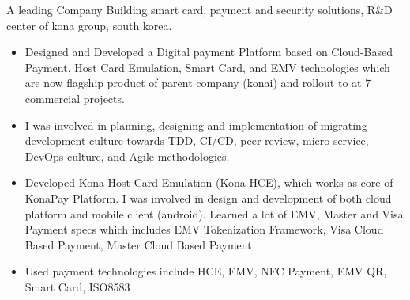 \documentclass[10pt,a4paper]{altacv}
\begin{document}


\begin{fullwidth}
\makecvheader
\end{fullwidth}





A leading Company Building smart card, payment and security solutions, R&D
center of kona group, south korea.
\begin{itemize}

\item Designed and Developed a Digital payment Platform based on Cloud-Based
Payment, Host Card Emulation, Smart Card, and EMV technologies which are now
flagship product of parent company (konai) and rollout to at 7 commercial
projects.
\item I was involved in planning, designing and implementation of migrating
development culture towards TDD, CI/CD, peer review, micro-service, DevOps
culture, and Agile methodologies.
\item Developed Kona Host Card Emulation (Kona-HCE), which works as core of KonaPay Platform. I was involved in design and development of both cloud platform and mobile client (android). Learned a lot of EMV, Master and Visa Payment specs which includes EMV Tokenization Framework, Visa Cloud Based Payment, Master Cloud Based Payment
\item Used payment technologies include HCE, EMV, NFC Payment, EMV QR, Smart Card, ISO8583
\end{itemize}
\end{document}
